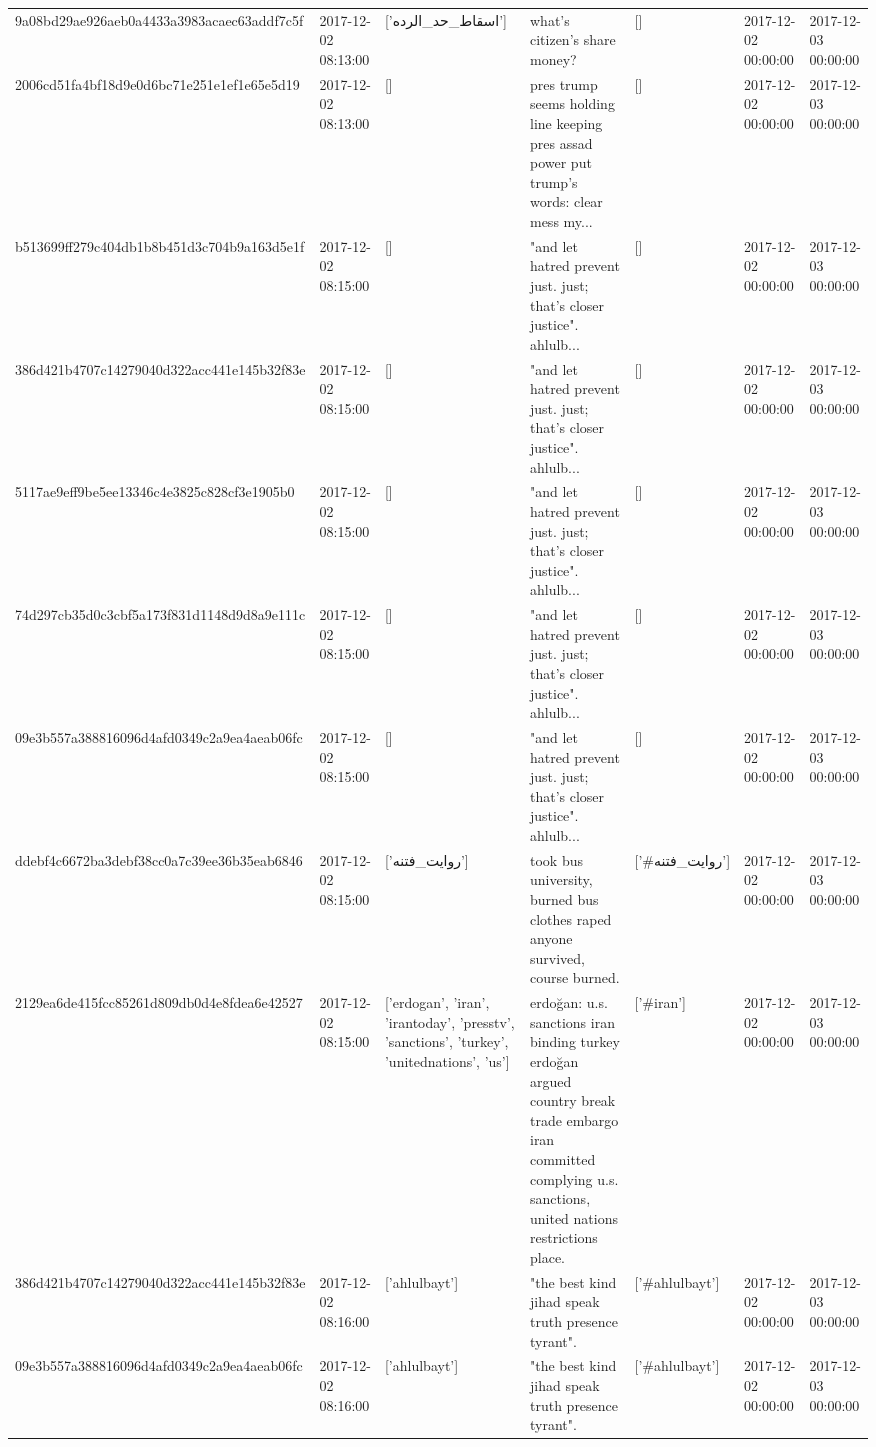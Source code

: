 \begin{tabular}{lllllll}
9a08bd29ae926aeb0a4433a3983acaec63addf7c5f & 2017-12-02 08:13:00 & ['اسقاط_حد_الرده'] & what's citizen's share money? & [] & 2017-12-02 00:00:00 & 2017-12-03 00:00:00 \\
2006cd51fa4bf18d9e0d6bc71e251e1ef1e65e5d19 & 2017-12-02 08:13:00 & [] & pres trump seems holding line keeping pres assad power put trump's words: clear mess my... & [] & 2017-12-02 00:00:00 & 2017-12-03 00:00:00 \\
b513699ff279c404db1b8b451d3c704b9a163d5e1f & 2017-12-02 08:15:00 & [] & "and let hatred prevent just. just; that's closer justice". ahlulb... & [] & 2017-12-02 00:00:00 & 2017-12-03 00:00:00 \\
386d421b4707c14279040d322acc441e145b32f83e & 2017-12-02 08:15:00 & [] & "and let hatred prevent just. just; that's closer justice". ahlulb... & [] & 2017-12-02 00:00:00 & 2017-12-03 00:00:00 \\
5117ae9eff9be5ee13346c4e3825c828cf3e1905b0 & 2017-12-02 08:15:00 & [] & "and let hatred prevent just. just; that's closer justice". ahlulb... & [] & 2017-12-02 00:00:00 & 2017-12-03 00:00:00 \\
74d297cb35d0c3cbf5a173f831d1148d9d8a9e111c & 2017-12-02 08:15:00 & [] & "and let hatred prevent just. just; that's closer justice". ahlulb... & [] & 2017-12-02 00:00:00 & 2017-12-03 00:00:00 \\
09e3b557a388816096d4afd0349c2a9ea4aeab06fc & 2017-12-02 08:15:00 & [] & "and let hatred prevent just. just; that's closer justice". ahlulb... & [] & 2017-12-02 00:00:00 & 2017-12-03 00:00:00 \\
ddebf4c6672ba3debf38cc0a7c39ee36b35eab6846 & 2017-12-02 08:15:00 & ['روایت_فتنه'] & took bus university, burned bus clothes raped anyone survived, course burned. & ['#روایت_فتنه'] & 2017-12-02 00:00:00 & 2017-12-03 00:00:00 \\
2129ea6de415fcc85261d809db0d4e8fdea6e42527 & 2017-12-02 08:15:00 & ['erdogan', 'iran', 'irantoday', 'presstv', 'sanctions', 'turkey', 'unitednations', 'us'] & erdoğan: u.s. sanctions iran binding turkey erdoğan argued country break trade embargo iran committed complying u.s. sanctions, united nations restrictions place. & ['#iran'] & 2017-12-02 00:00:00 & 2017-12-03 00:00:00 \\
386d421b4707c14279040d322acc441e145b32f83e & 2017-12-02 08:16:00 & ['ahlulbayt'] & "the best kind jihad speak truth presence tyrant". & ['#ahlulbayt'] & 2017-12-02 00:00:00 & 2017-12-03 00:00:00 \\
09e3b557a388816096d4afd0349c2a9ea4aeab06fc & 2017-12-02 08:16:00 & ['ahlulbayt'] & "the best kind jihad speak truth presence tyrant". & ['#ahlulbayt'] & 2017-12-02 00:00:00 & 2017-12-03 00:00:00 \\

\end{tabular}
